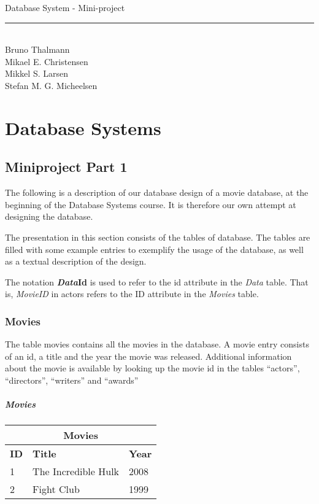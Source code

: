 
\newcommand{\HRule}{\rule{\linewidth}{0.5mm}}


\begin{titlepage}
\centering
{\LARGE Database System - Mini-project}
\HRule \\[0.5cm]
Bruno Thalmann\\
			Mikael E. Christensen\\
			Mikkel S. Larsen\\
			Stefan M. G. Micheelsen
\end{titlepage}

\chapter*{Database Systems}

\section{Miniproject Part 1}
The following is a description of our database design of a movie database, at the beginning of the Database Systems course.
It is therefore our own attempt at designing the database.

The presentation in this section consists of the tables of database.
The tables are filled with some example entries to exemplify the usage of the database, as well as a textual description of the design.

The notation \textbf{\textit{Data}Id} is used to refer to the id attribute in the \textit{Data} table.
That is, \textit{MovieID} in actors refers to the ID attribute in the \textit{Movies} table.

\subsection{Movies}
The table movies contains all the movies in the database. 
A movie entry consists of an id, a title and the year the movie was released.
Additional information about the movie is available by looking up the movie id in the tables ``actors'', ``directors'', ``writers'' and ``awards''

\paragraph{Movies}
\begin{center}
\begin{tabular}{|l|l|l|}
\hline
\multicolumn{3}{|c|}{Movies} \\ \hline \hline
\textbf{ID} & \textbf{Title} & \textbf{Year} \\ \hline \hline
1 & The Incredible Hulk & 2008 \\ \hline
2 & Fight Club & 1999 \\ \hline
\end{tabular}
\end{center}

